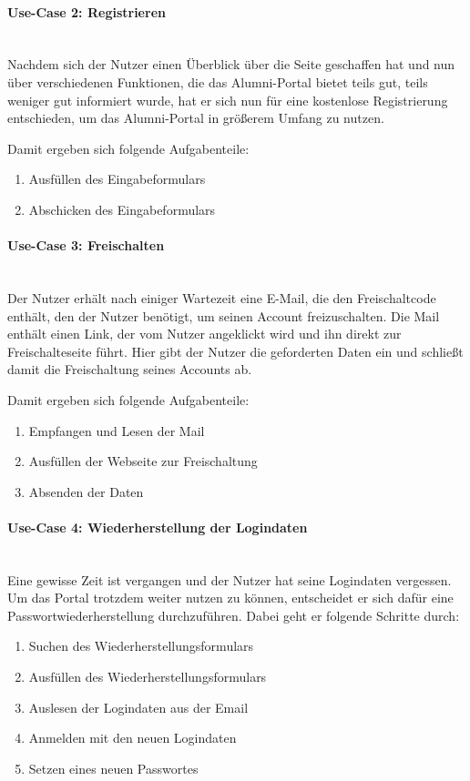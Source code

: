\paragraph{Use-Case 2: Registrieren}\quad\\
Nachdem sich der Nutzer einen Überblick über die Seite geschaffen hat und nun über verschiedenen Funktionen, die das Alumni-Portal bietet teils gut, teils weniger gut informiert wurde, hat er sich nun für eine kostenlose Registrierung entschieden, um das Alumni-Portal in größerem Umfang zu nutzen.

Damit ergeben sich folgende Aufgabenteile:
\begin{enumerate}
		\item Ausfüllen des Eingabeformulars
		\item Abschicken des Eingabeformulars
\end{enumerate}

\paragraph{Use-Case 3: Freischalten}\quad\\
Der Nutzer erhält nach einiger Wartezeit eine E\hbox{-}Mail, die den Freischaltcode enthält, den der Nutzer benötigt, um seinen Account freizuschalten. Die Mail enthält einen Link, der vom Nutzer angeklickt wird und ihn direkt zur Freischalteseite führt. Hier gibt der Nutzer die geforderten Daten ein und schließt damit die Freischaltung seines Accounts ab.

Damit ergeben sich folgende Aufgabenteile:
\begin{enumerate}
		\item Empfangen und Lesen der Mail
		\item Ausfüllen der Webseite zur Freischaltung
		\item Absenden der Daten
\end{enumerate}


\paragraph{Use-Case 4: Wiederherstellung der Logindaten}\quad\\
Eine gewisse Zeit ist vergangen und der Nutzer hat seine Logindaten vergessen. Um das Portal trotzdem weiter nutzen zu können, entscheidet er sich dafür eine Passwortwiederherstellung durchzuführen. 
Dabei geht er folgende Schritte durch:
\begin{enumerate}
\item Suchen des Wiederherstellungsformulars
\item Ausfüllen des Wiederherstellungsformulars
\item Auslesen der Logindaten aus der Email
\item Anmelden mit den neuen Logindaten
\item Setzen eines neuen Passwortes
\end{enumerate}


